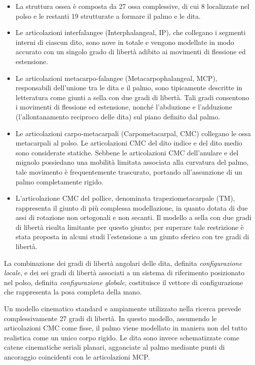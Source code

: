 \begin{itemize}
    \item La struttura ossea è composta da 27 ossa complessive, di cui 8 localizzate nel polso e le restanti 19 strutturate a formare il palmo e le dita.
    
    \item Le articolazioni interfalangee (Interphalangeal, IP), che collegano i segmenti interni di ciascun dito, sono nove in totale e vengono modellate in modo accurato con un singolo grado di libertà adibito ai movimenti di flessione ed estensione.
    
    \item Le articolazioni metacarpo-falangee (Metacarpophalangeal, MCP), responsabili dell'unione tra le dita e il palmo, sono tipicamente descritte in letteratura come giunti a sella con due gradi di libertà.
    Tali gradi consentono i movimenti di flessione ed estensione, nonché l'abduzione e l'adduzione (l'allontanamento reciproco delle dita) sul piano definito dal palmo.
    
    \item Le articolazioni carpo-metacarpali (Carpometacarpal, CMC) collegano le ossa metacarpali al polso.
    Le articolazioni CMC del dito indice e del dito medio sono considerate statiche. 
    Sebbene le articolazioni CMC dell'anulare e del mignolo possiedano una mobilità limitata associata alla curvatura del palmo, tale movimento è frequentemente trascurato, portando all'assunzione di un palmo completamente rigido.
    
    \item L'articolazione CMC del pollice, denominata trapeziometacarpale (TM), rappresenta il giunto di più complessa modellazione, in quanto dotata di due assi di rotazione non ortogonali e non secanti. 
    Il modello a sella con due gradi di libertà risulta limitante per questo giunto; per superare tale restrizione è stata proposta in alcuni studi l'estensione a un giunto sferico con tre gradi di libertà.
\end{itemize}

La combinazione dei gradi di libertà angolari delle dita, definita \emph{configurazione locale}, e dei sei gradi di libertà associati a un sistema di riferimento posizionato nel polso, definita \emph{configurazione globale}, costituisce il vettore di configurazione che rappresenta la posa completa della mano.

Un modello cinematico standard e ampiamente utilizzato nella ricerca prevede complessivamente 27 gradi di libertà. 
In questo modello, assumendo le articolazioni CMC come fisse, il palmo viene modellato in maniera non del tutto realistica come un unico corpo rigido. 
Le dita sono invece schematizzate come catene cinematiche seriali planari, agganciate al palmo mediante punti di ancoraggio coincidenti con le articolazioni MCP.

